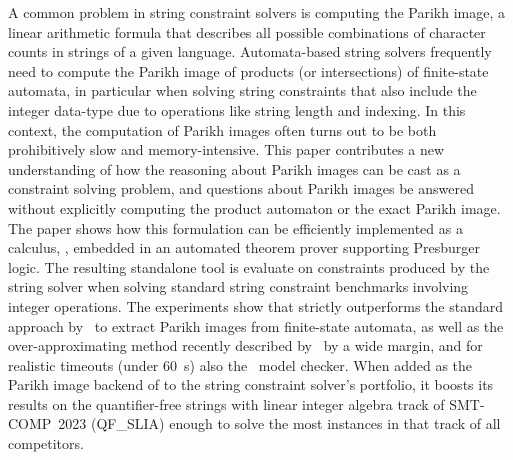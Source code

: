 A common problem in string constraint solvers is computing the Parikh image, a
linear arithmetic formula that describes all possible combinations of character
counts in strings of a given language. Automata-based string solvers frequently
need to compute the Parikh image of products (or intersections) of
finite-state automata, in particular when solving string constraints that
also include the integer data-type due to operations like string length
and indexing. In this context, the computation of Parikh images often turns
out to be both prohibitively slow
and memory-intensive. This paper contributes a new understanding of how
the reasoning about Parikh images can be cast as a constraint solving problem,
and questions about Parikh images be answered without explicitly computing
the product automaton or the exact Parikh image. The paper shows
how this formulation can be efficiently implemented as a calculus,
\Calculus{}, embedded in an automated theorem prover supporting
Presburger logic. The resulting standalone tool
\Catra{} is evaluate on constraints produced by the \OstrichPlus{} string
solver when solving standard string constraint benchmarks
involving integer operations.
The experiments show that \Calculus{} strictly outperforms the
standard approach by~\citeauthor{generate-parikh-image} to extract Parikh
images from finite-state automata, as well as the
over-approximating method recently described by~\citeauthor{approximate-parikh}
by a wide margin, and for realistic timeouts (under \SI{60}{s}) also
the~\Nuxmv{} model checker. When added as the Parikh image backend of \OstrichPlus{} to
the \Ostrich{} string constraint solver's portfolio, it boosts its results on the
quantifier-free strings with linear integer algebra track of SMT-COMP~2023 (QF\_SLIA)
enough to solve the most \Unsat{} instances in that track of all competitors.